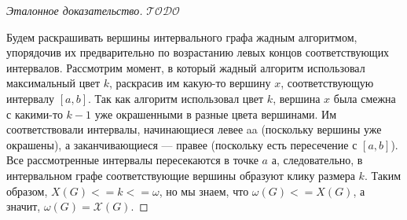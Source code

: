 \documentclass[a4paper,12pt]{article}
\numberwithin{figure}{section}
\theoremstyle{remark}
\def\iiChi{\mathcal{X}}
\def\iiTODO{\guillemotleft$\mathcal{TODO}$\guillemotright\textellipsis}
\begin{document}
\begin{proof}[Эталонное доказательство]
	\iiTODO
	
	Будем раскрашивать вершины интервального графа жадным алгоритмом, упорядочив их предварительно по возрастанию левых концов соответствующих интервалов. Рассмотрим момент, в который жадный алгоритм использовал максимальный цвет $k$, раскрасив им какую-то вершину $x$, соответствующую интервалу $[a,b]$. Так как алгоритм использовал цвет $k$, вершина $x$ была смежна с какими-то $k-1$ уже окрашенными в разные цвета вершинами. Им соответствовали интервалы, начинающиеся левее aa (поскольку вершины уже окрашены), а заканчивающиеся — правее (поскольку есть пересечение с $[a,b]$). Все рассмотренные интервалы пересекаются в точке $a$ а, следовательно, в интервальном графе соответствующие вершины образуют клику размера $k$.
	Таким образом, $X(G)<=k<=\omega$, но мы знаем, что $\omega(G)<=X(G)$, а значит, $\omega(G)=\iiChi(G)$.
\end{proof}
\end{document}

